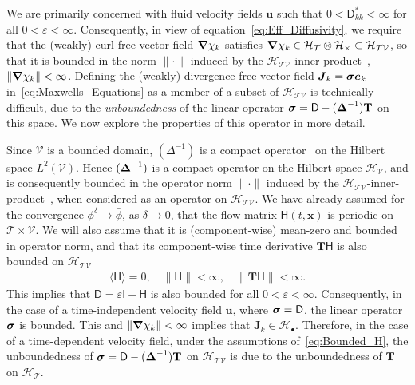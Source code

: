 \documentclass[leqno,onefignum,onetabnum]{siamltex1213}
\newcommand{\Tb}{\mathbf{T}}
\newcommand{\Tc}{\mathcal{T}}
\newcommand{\Vc}{\mathcal{V}}
\newcommand{\Hc}{\mathcal{H}}
\newcommand{\Dm}{\mathsf{D}}
\newcommand{\Hm}{\mathsf{H}}
\newcommand{\Ib}{\mathsf{I}}
\newcommand\bsig{\mbox{\boldmath${\sigma}$}}
\newcommand\bDelta{\mbox{\boldmath${\Delta}$}}
\newcommand\bnabla{\mbox{\boldmath${\nabla}$}}
\newcommand{\vecJ}{\boldsymbol{J}}
\newcommand{\vecx}{\boldsymbol{x}}
\newcommand{\vecu}{\boldsymbol{u}}
\newcommand{\vece}{\boldsymbol{e}}
\begin{document}
We are primarily concerned with fluid velocity fields $\vecu $ such
that $0<\Dm^*_{kk}<\infty$ for all $0<\varepsilon<\infty$. Consequently, in view of
equation~\eqref{eq:Eff_Diffusivity}, we require that the (weakly)
curl-free vector field $\bnabla \chi_k$ satisfies
$\bnabla \chi_k\in\Hc_{\Tc}\otimes\Hc_\times\subset\Hc_{\Tc\Vc}$, so that it is
bounded in the norm $\|\cdot\|$ induced by the
$\Hc_{\Tc\Vc}$-inner-product~\cite{Folland:99}, $\|\bnabla
\chi_k\|<\infty$. Defining the (weakly) 
divergence-free vector field $\vecJ_k=\bsig\vece _k$
in~\eqref{eq:Maxwells_Equations} as a member of a subset of 
$\Hc_{\Tc\Vc}$ is technically difficult, due to the
\emph{unboundedness} of the linear operator
$\bsig=\Dm-(\bDelta^{-1})\Tb$ on this space. We now explore the
properties of this operator in more detail.  





Since $\Vc$ is a bounded domain, $(\Delta^{-1})$ is a compact
operator~\cite{Stakgold:BVP:2000} on the Hilbert space
$L^2(\Vc)$. Hence 
$(\bDelta^{-1})$ is a compact operator on the Hilbert space
$\Hc_{\Vc}$, and is consequently bounded in the operator norm $\|\cdot\|$
induced by the
$\Hc_{\Tc\Vc}$-inner-product~\cite{Reed-1980,Stone:64,Stakgold:BVP:2000},
when considered as an  
operator on $\Hc_{\Tc\Vc}$.  We have already assumed 
for the convergence $\phi^\delta\to\bar{\phi}$, as $\delta\to0$, that the flow matrix
$\Hm(t,\vecx)$ is periodic on $\Tc\times\Vc$. We will also assume that it
is (component-wise) mean-zero and bounded in operator norm, and that
its component-wise time derivative $\Tb\Hm$ is also bounded on
$\Hc_{\Tc\Vc}$ 
%
\begin{align}\label{eq:Bounded_H}
  \langle\Hm\rangle=0, \quad \|\Hm\|<\infty, \quad \|\Tb\Hm\|<\infty.
\end{align}
%
This implies that $\Dm=\varepsilon\Ib+\Hm$ is also bounded for all
$0<\varepsilon<\infty$. Consequently, in the case of a time-independent velocity 
field $\vecu $, where $\bsig=\Dm$, the linear operator $\bsig$ is
bounded. This and $\|\bnabla \chi_k\|<\infty$ implies that 
$\vecJ_k\in\Hc_\bullet$. Therefore, in the case of a time-dependent velocity
field, under the assumptions of~\eqref{eq:Bounded_H}, the
unboundedness of $\bsig=\Dm-(\bDelta^{-1})\Tb$ on $\Hc_{\Tc\Vc}$
is due to the unboundedness of $\Tb$ on $\Hc_{\Tc}$.   
\end{document}
